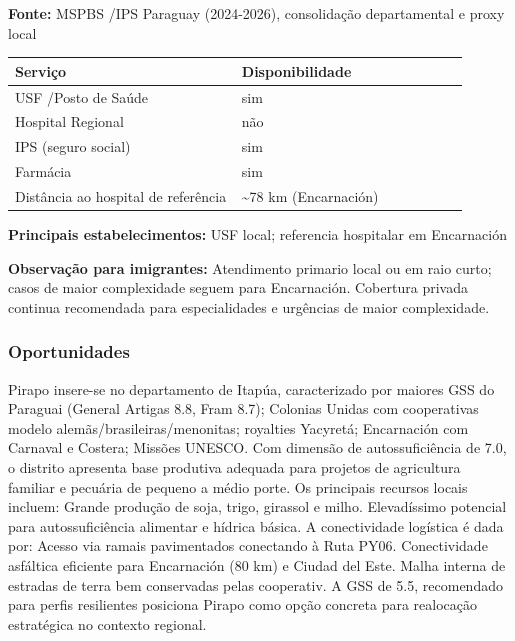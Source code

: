 \textbf{Fonte:} MSPBS /\allowbreak  IPS Paraguay (2024-2026), consolidação
departamental e proxy local

{\def\LTcaptype{none} %
\begin{longtable}{@{}>{\raggedright\arraybackslash}p{0.45\linewidth} >{\raggedright\arraybackslash}p{0.45\linewidth}@{}}
\toprule\noalign{}
Serviço & Disponibilidade \\
\midrule\noalign{}
\endhead
\bottomrule\noalign{}
\endlastfoot
USF /\allowbreak  Posto de Saúde & sim \\
Hospital Regional & não \\
IPS (seguro social) & sim \\
Farmácia & sim \\
Distância ao hospital de referência & \textasciitilde78 km
(Encarnación) \\
\end{longtable}
}

\textbf{Principais estabelecimentos:} USF local; referencia hospitalar
em Encarnación

\textbf{Observação para imigrantes:} Atendimento primario local ou em
raio curto; casos de maior complexidade seguem para Encarnación.
Cobertura privada continua recomendada para especialidades e urgências
de maior complexidade.
\newpage

\subsubsection*{Oportunidades}\label{oport-pirapo-0729}
Pirapo insere-se no departamento de Itapúa, caracterizado por maiores GSS do Paraguai (General Artigas 8.8, Fram 8.7); Colonias Unidas com cooperativas modelo alemãs/brasileiras/menonitas; royalties Yacyretá; Encarnación com Carnaval e Costera; Missões UNESCO. Com dimensão de autossuficiência de 7.0, o distrito apresenta base produtiva adequada para projetos de agricultura familiar e pecuária de pequeno a médio porte. Os principais recursos locais incluem: Grande produção de soja, trigo, girassol e milho. Elevadíssimo potencial para autossuficiência alimentar e hídrica básica. A conectividade logística é dada por: Acesso via ramais pavimentados conectando à Ruta PY06. Conectividade asfáltica eficiente para Encarnación (80 km) e Ciudad del Este. Malha interna de estradas de terra bem conservadas pelas cooperativ. A GSS de 5.5, recomendado para perfis resilientes posiciona Pirapo como opção concreta para realocação estratégica no contexto regional.


